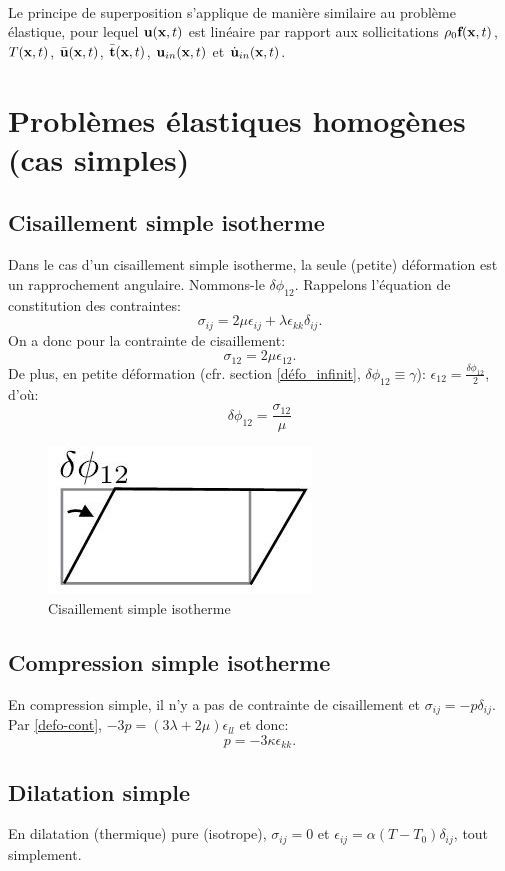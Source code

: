 \paragraph{}
Le principe de superposition s'applique de manière similaire au problème élastique, pour lequel $\textbf{u}(\textbf{x},t)$ est linéaire par rapport aux sollicitations $\rho_0\textbf{f}(\textbf{x},t)$, $T(\textbf{x},t)$, $\bar{\textbf{u}}(\textbf{x},t)$, $\bar{\textbf{t}}(\textbf{x},t)$, $\textbf{u}_{in}(\textbf{x},t)$ et $\dot{\textbf{u}}_{in}(\textbf{x},t)$.

\section{Problèmes élastiques homogènes (cas simples)}
\subsection{Cisaillement simple isotherme}
Dans le cas d'un cisaillement simple isotherme, la seule (petite) déformation est un rapprochement angulaire. Nommons-le $\delta\phi_{12}$. Rappelons l'équation de constitution des contraintes:
$$\sigma_{ij}=2\mu\epsilon_{ij}+\lambda\epsilon_{kk}\delta_{ij}.$$ On a donc pour la contrainte de cisaillement:
$$\sigma_{12}=2\mu\epsilon_{12}.$$ De plus, en petite déformation (cfr. section \ref{défo_infinit}, $\delta\phi_{12}\equiv \gamma$): $\epsilon_{12}=\frac{\delta\phi_{12}}{2}$, d'où:
$$\delta\phi_{12}=\frac{\sigma_{12}}{\mu}$$
\begin{figure}[!h]
\centering
\includegraphics[scale=0.6]{./cisaillementsimplefig.jpg}
\caption{Cisaillement simple isotherme}
\label{fig:cis}
\end{figure}
\subsection{Compression simple isotherme}
En compression simple, il n'y a pas de contrainte de cisaillement et $\sigma_{ij}=-p\delta_{ij}$. Par \ref{defo-cont}, $-3p=(3\lambda+2\mu)\epsilon_{ll}$ et donc:
$$p=-3\kappa\epsilon_{kk}.$$

\subsection{Dilatation simple}
En dilatation (thermique) pure (isotrope), $\sigma_{ij}=0$ et $\epsilon_{ij}=\alpha(T-T_0)\delta_{ij}$, tout simplement.
